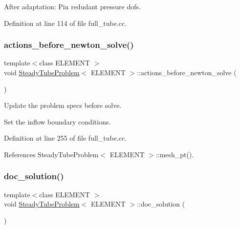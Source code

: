 After adaptation\+: Pin redudant pressure dofs. 



Definition at line 114 of file full\+\_\+tube.\+cc.

\mbox{\label{classSteadyTubeProblem_a5c5277cac2a887dc6c85892e9f851f97}} 
\subsubsection{\texorpdfstring{actions\+\_\+before\+\_\+newton\+\_\+solve()}{actions\_before\_newton\_solve()}}
{\footnotesize\ttfamily template$<$class E\+L\+E\+M\+E\+NT $>$ \\
void \hyperlink{classSteadyTubeProblem}{Steady\+Tube\+Problem}$<$ E\+L\+E\+M\+E\+NT $>$\+::actions\+\_\+before\+\_\+newton\+\_\+solve (\begin{DoxyParamCaption}{ }\end{DoxyParamCaption})}



Update the problem specs before solve. 

Set the inflow boundary conditions. 

Definition at line 255 of file full\+\_\+tube.\+cc.



References Steady\+Tube\+Problem$<$ E\+L\+E\+M\+E\+N\+T $>$\+::mesh\+\_\+pt().

\mbox{\label{classSteadyTubeProblem_ae384d816cf88c86e9f18549701d791f8}} 
\subsubsection{\texorpdfstring{doc\+\_\+solution()}{doc\_solution()}}
{\footnotesize\ttfamily template$<$class E\+L\+E\+M\+E\+NT $>$ \\
void \hyperlink{classSteadyTubeProblem}{Steady\+Tube\+Problem}$<$ E\+L\+E\+M\+E\+NT $>$\+::doc\+\_\+solution (\begin{DoxyParamCaption}{ }\end{DoxyParamCaption})}



